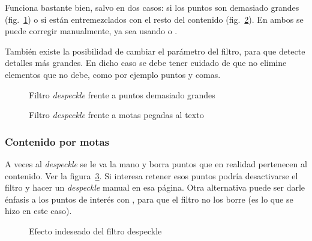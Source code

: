 \documentclass[%
	a5paper,
	10pt,
	twoside,
	openright,
	final,
]{memoir}
\begin{document}
{	Funciona bastante bien, salvo en dos casos: si los puntos son demasiado grandes (fig.~\ref{fig:SToutputDespeckleSpot}) o si están entremezclados con el resto del contenido (fig.~\ref{fig:SToutputDespeckleSpeckle}). En ambos se puede corregir manualmente, ya sea usando \gimp o .

	También existe la posibilidad de cambiar el parámetro del filtro, para que detecte detalles más grandes. En dicho caso se debe tener cuidado de que no elimine elementos que no debe, como por ejemplo puntos y comas.

	\begin{figure}
		\hfill
		\caption{Filtro \emph{despeckle} frente a puntos demasiado grandes\label{fig:SToutputDespeckleSpot}}
	\end{figure}

	\begin{figure}
		\hfill
		\caption{Filtro \emph{despeckle} frente a motas pegadas al texto\label{fig:SToutputDespeckleSpeckle}}
	\end{figure}

	\subsubsection{Contenido por motas} A veces al \emph{despeckle} se le va la mano y borra puntos que en realidad pertenecen al contenido. Ver la figura~\ref{fig:SToutputDespeckle}. Si interesa retener esos puntos podría desactivarse el filtro y hacer un \emph{despeckle} manual en esa página. Otra alternativa puede ser darle énfasis a los puntos de interés con \gimp, para que el filtro no los borre (es lo que se hizo en este caso).

	\begin{figure}
		\caption{Efecto indeseado del filtro despeckle\label{fig:SToutputDespeckle}}
	\end{figure}

}
\end{document}
